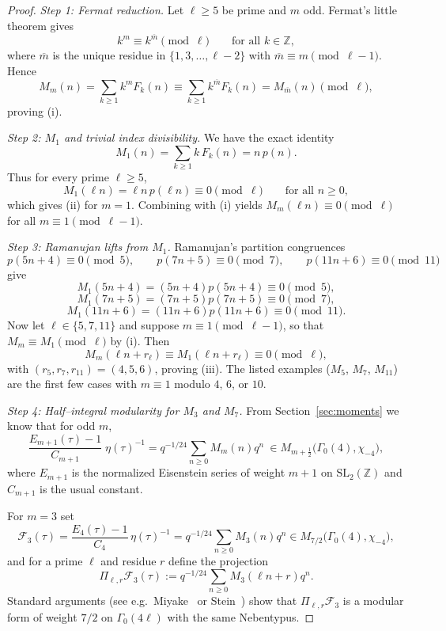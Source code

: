 \documentclass[11pt]{article}
\theoremstyle{definition}
\theoremstyle{remark}
\begin{document}
\begin{proof}
\emph{Step 1: Fermat reduction.}
Let $\ell\ge5$ be prime and $m$ odd.  Fermat's little theorem gives
\[
k^m\equiv k^{\overline m}\pmod{\ell}\qquad\text{for all }k\in\mathbb{Z},
\]
where $\overline m$ is the unique residue in $\{1,3,\dots,\ell-2\}$ with
$\overline m\equiv m\pmod{\ell-1}$.  Hence
\[
M_m(n)=\sum_{k\ge1}k^mF_k(n)
\equiv \sum_{k\ge1}k^{\overline m}F_k(n)
= M_{\overline m}(n)\pmod{\ell},
\]
proving \textup{(i)}.

\smallskip
\emph{Step 2: $M_1$ and trivial index divisibility.}
We have the exact identity
\[
M_1(n)=\sum_{k\ge1}k\,F_k(n)=n\,p(n).
\]
Thus for every prime $\ell\ge5$,
\[
M_1(\ell n)=\ell n\,p(\ell n)\equiv0\pmod{\ell}\qquad\text{for all }n\ge0,
\]
which gives \textup{(ii)} for $m=1$.  Combining with \textup{(i)} yields
$M_m(\ell n)\equiv0\pmod{\ell}$ for all $m\equiv1\pmod{\ell-1}$.

\smallskip
\emph{Step 3: Ramanujan lifts from $M_1$.}
Ramanujan's partition congruences
\[
p(5n+4)\equiv0\pmod5,\qquad
p(7n+5)\equiv0\pmod7,\qquad
p(11n+6)\equiv0\pmod{11}
\]
give
\[
M_1(5n+4)=(5n+4)p(5n+4)\equiv0\pmod5,
\]
\[
M_1(7n+5)=(7n+5)p(7n+5)\equiv0\pmod7,
\]
\[
M_1(11n+6)=(11n+6)p(11n+6)\equiv0\pmod{11}.
\]
Now let $\ell\in\{5,7,11\}$ and suppose $m\equiv1\pmod{\ell-1}$, so that
$M_m\equiv M_1\pmod{\ell}$ by \textup{(i)}.  Then
\[
M_m(\ell n+r_\ell)\equiv M_1(\ell n+r_\ell)\equiv0\pmod{\ell},
\]
with $(r_5,r_7,r_{11})=(4,5,6)$, proving \textup{(iii)}.  The listed
examples ($M_5$, $M_7$, $M_{11}$) are the first few cases with
$m\equiv1$ modulo $4$, $6$, or $10$.

\smallskip
\emph{Step 4: Half--integral modularity for $M_3$ and $M_7$.}
From Section~\ref{sec:moments} we know that for odd $m$,
\[
\frac{E_{m+1}(\tau)-1}{C_{m+1}}\;\eta(\tau)^{-1}
= q^{-1/24}\sum_{n\ge0}M_m(n)q^n\
\in M_{m+\tfrac12}\bigl(\Gamma_0(4),\chi_{-4}\bigr),
\]
where $E_{m+1}$ is the normalized Eisenstein series of weight $m+1$ on
$\mathrm{SL}_2(\mathbb{Z})$ and $C_{m+1}$ is the usual constant.

For $m=3$ set
\[
\mathcal{F}_3(\tau)
=\frac{E_4(\tau)-1}{C_4}\,\eta(\tau)^{-1}
= q^{-1/24}\sum_{n\ge0}M_3(n)q^n
\in M_{7/2}\bigl(\Gamma_0(4),\chi_{-4}\bigr),
\]
and for a prime $\ell$ and residue $r$ define the projection
\[
\Pi_{\ell,r}\mathcal{F}_3(\tau)
:= q^{-1/24}\sum_{n\ge0}M_3(\ell n+r)q^n.
\]
Standard arguments (see e.g.\ Miyake~\cite{Miyake2006} or Stein~\cite{Stein2007})
show that $\Pi_{\ell,r}\mathcal{F}_3$ is a modular form of weight $7/2$ on
$\Gamma_0(4\ell)$ with the same Nebentypus.


\end{proof}
\end{document}
